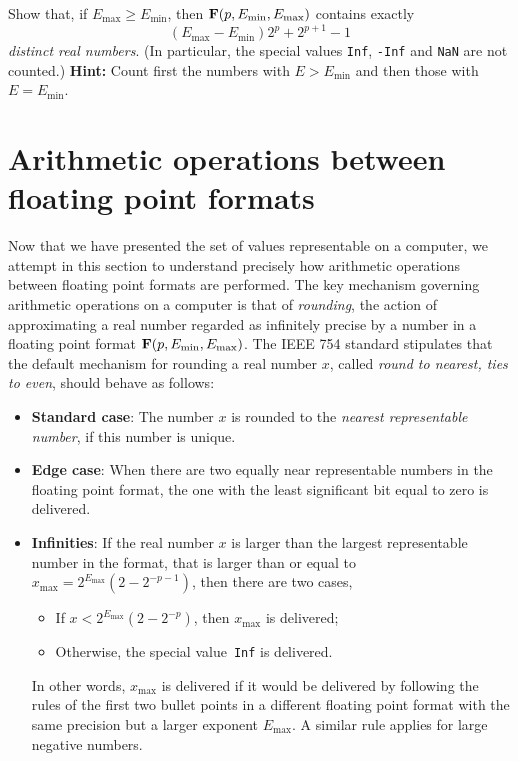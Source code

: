 \begin{exercise}
    \label{exercise:cardinality_floating}
    Show that, if $E_{\max} \geq E_{\min}$, then $\mathbf F(p, E_{\min}, E_{\max})$ contains exactly
    \[
        (E_{\max} - E_{\min}) 2^{p} + 2^{p+1} - 1
    \]
    \emph{distinct real numbers}.
    (In particular, the special values \texttt{Inf}, \texttt{-Inf} and \texttt{NaN} are not counted.)
    \textbf{Hint:} Count first the numbers with $E > E_{\min}$ and then those with $E = E_{\min}$.
\end{exercise}

\section{Arithmetic operations between floating point formats}%
\label{sec:arithmetic_operations_between_floating_point_formats}

Now that we have presented the set of values representable on a computer,
we attempt in this section to understand precisely how arithmetic operations between floating point formats are performed.
The key mechanism governing arithmetic operations on a computer is that of \emph{rounding},
the action of approximating a real number regarded as infinitely precise by a number in a floating point format $\mathbf F (p, E_{\min}, E_{\max})$.
The IEEE 754 standard stipulates that the default mechanism for rounding a real number $x$,
called \emph{round to nearest, ties to even},
should behave as follows:
\begin{itemize}
    \item
        \textbf{Standard case}:
        The number $x$ is rounded to the \emph{nearest representable number},
        if this number is unique.
    \item
        \textbf{Edge case}:
        When there are two equally near representable numbers in the floating point format,
        the one with the least significant bit equal to zero is delivered.
    \item
        \textbf{Infinities}:
        If the real number $x$ is larger than the largest representable number in the format,
        that is larger than or equal to $x_{\max} = 2^{E_{\max}} (2 - 2^{-p-1})$,
        then there are two cases,
        \begin{itemize}
            \item If $x < 2^{E_{\max}} (2 - 2^{-p})$, then $x_{\max}$ is delivered;
            \item Otherwise, the special value~\texttt{Inf} is delivered.
        \end{itemize}
        In other words, $x_{\max}$ is delivered if it would be delivered by following the rules of the first two bullet points
        in a different floating point format with the same precision but a larger exponent $E_{\max}$.
        A similar rule applies for large negative numbers.
\end{itemize}

